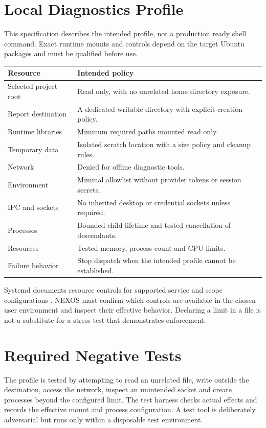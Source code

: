 \section{Local Diagnostics Profile}
This specification describes the intended profile, not a production ready shell command. Exact runtime mounts and controls depend on the target Ubuntu packages and must be qualified before use.
\begin{longtable}{P{40mm}P{98mm}}
\toprule\textbf{Resource} & \textbf{Intended policy}\\\midrule\endhead
Selected project root & Read only, with no unrelated home directory exposure.\\
Report destination & A dedicated writable directory with explicit creation policy.\\
Runtime libraries & Minimum required paths mounted read only.\\
Temporary data & Isolated scratch location with a size policy and cleanup rules.\\
Network & Denied for offline diagnostic tools.\\
Environment & Minimal allowlist without provider tokens or session secrets.\\
IPC and sockets & No inherited desktop or credential sockets unless required.\\
Processes & Bounded child lifetime and tested cancellation of descendants.\\
Resources & Tested memory, process count and CPU limits.\\
Failure behavior & Stop dispatch when the intended profile cannot be established.\\\bottomrule
\end{longtable}

Systemd documents resource controls for supported service and scope configurations \cite{systemd}. NEXOS must confirm which controls are available in the chosen user environment and inspect their effective behavior. Declaring a limit in a file is not a substitute for a stress test that demonstrates enforcement.

\section{Required Negative Tests}
The profile is tested by attempting to read an unrelated file, write outside the destination, access the network, inspect an unintended socket and create processes beyond the configured limit. The test harness checks actual effects and records the effective mount and process configuration. A test tool is deliberately adversarial but runs only within a disposable test environment.

